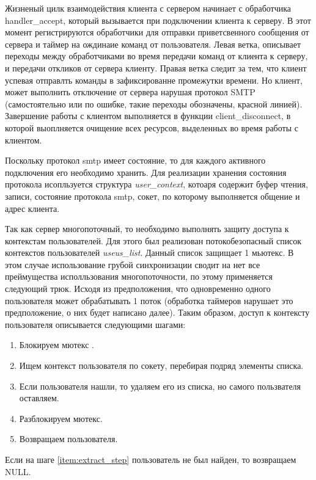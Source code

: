\documentclass[a4paper,12pt]{report}
\begin{document}
	Жизненый цилк взаимодействия клиента с сервером начинает с обработчика handler\_accept, который вызывается при подключении клиента к серверу. В этот момент регистрируются обработчики для отправки приветсвенного сообщения от сервера и таймер на ождинаие команд от пользователя. Левая ветка, описывает переходы между обработчиками во время передачи команд от клиента к серверу, и передачи откликов от сервера клиенту. Правая ветка следит за тем, что клиент успевая отправлть команды в зафиксированне промежутки времени. Но клиент, может выполнить отключение от сервера нарушая протокол SMTP (самостоятельно или по ошибке, такие переходы обозначены, красной линией). Завершение работы с клиентом выполняется в функции client\_disconnect, в которой выоплняется очищение всех ресурсов, выделенных во время работы с клиентом.

	Поскольку протокол smtp имеет состояние, то для каждого активного подключения его необходимо хранить. Для реализации хранения состояния протокола исопльзуется структура \textit{user\_context}, котоаря содержит буфер чтения, записи, состояние протокола smtp, сокет, по которому выполняется общение и адрес клиента. 

	Так как сервер многопоточный, то необходимо выполнять защиту доступа к контекстам пользователей. Для этого был реализован потокобезопасный список контекстов пользователей \textit{useus\_list}. Данный список защищает 1 мьютекс. В этом случае использование грубой синхронизации сводит на нет все преймущества исполльзования многопоточности, по этому применяется следующий трюк. Исходя из предположения, что одновременно одного пользователя может обрабатывать 1 поток (обработка таймеров нарушает это предположение, о них будет написано далее). Таким образом, доступ к контексту пользователя описывается следующими шагами:
	
	\begin{enumerate}
		\item Блокируем мютекс .
		\item Ищем контекст пользователя по сокету, перебирая подряд элементы списка.
		\item \label{item:extract_step} Если пользователя нашли, то удаляем его из списка, но самого пользвателя оставляем. 
		\item Разблокируем мютекс.
		\item Возвращаем пользователя. 
	\end{enumerate}

	Если на шаге \ref{item:extract_step} пользователь не был найден, то возвращаем NULL.
	
\end{document}
